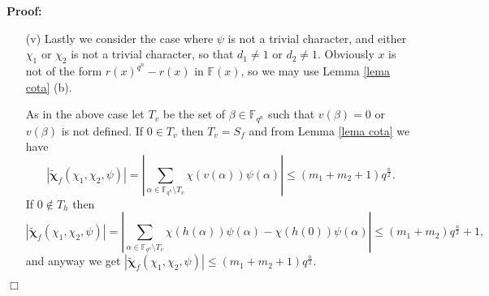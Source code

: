 \documentclass[12pt]{article}
\newenvironment{proof}{\noindent \textbf{Proof: }}{\hfill
$\Box$  \vspace{1ex}}
\newcommand{\F}{\mathbb{F}}
\def\bchi{\boldsymbol{\chi}}
\begin{document}
\begin{proof}
\begin{enumerate}
%

\item[(v)] 
Lastly we consider the case where $\psi$ is not a trivial character, and either 
$\chi_1$ or $\chi_2$ is not a trivial character, so that  $d_1\neq 1$ or 
$d_2\neq 1$.
Obviously 
$x$ is not of the form $r(x)^{q^n}-r(x)$ in $\F(x)$, so we may use
Lemma \ref{lema cota} (b).

As in the above case
let $T_v$ be the set of $\beta \in \mathbb{F}_{q^n}$ such that $v(\beta) = 0$ or
$v(\beta)$ is not defined. If $0 \in T_v$ then $T_v = S_f$ and from Lemma
\ref{lema cota} we have
$$
\left| \tilde{\bchi}_f(\chi_{1},\chi_{2},\psi) \right|
=
\left| \sum_{\alpha\in\F_{q^n}\setminus T_v}\chi(v(\alpha)) \psi(\alpha)
\right| 
\leq (m_1 + m_2+1) q^{\frac{n}{2}}.
$$
If $0 \notin T_h$ then %
$$
\left| \tilde{\bchi}_f(\chi_{1},\chi_{2},\psi)\right|
 =
\left| \sum_{\alpha\in\F_{q^n}\setminus T_v}\chi(h(\alpha))\psi(\alpha) -
\chi(h(0)) \psi(\alpha)
\right| \leq (m_1 + m_2) q^{\frac{n}{2}} + 1 ,
$$
and
anyway we get $| \tilde{\bchi}_f(\chi_{1},\chi_{2},\psi) | \leq (m_1 + m_2 + 1)
q^{\frac{n}{2}}$.
\end{enumerate}



\end{proof}
\end{document}
